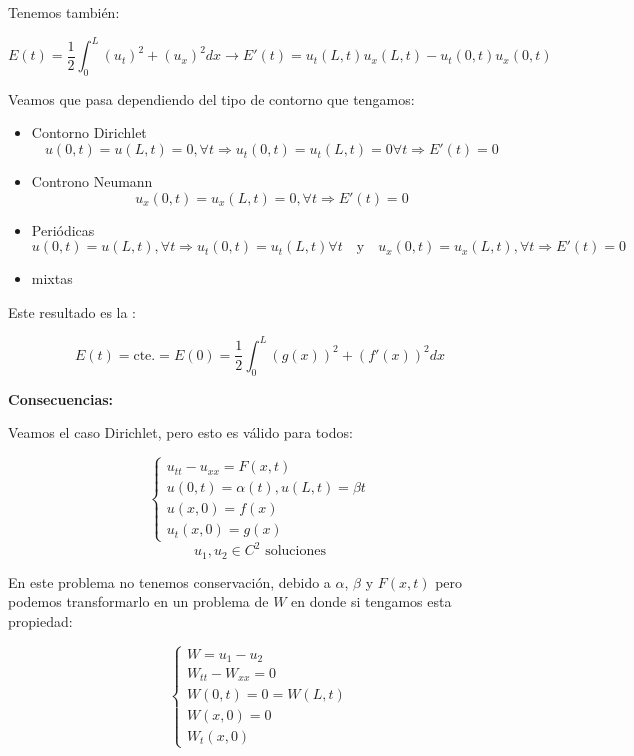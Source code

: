 		 Tenemos también:

		 \[ E(t) =  \frac{1}{2}\int_0^L (u_t)^2 + (u_x)^2 dx \rightarrow E'(t) = u_t (L,t) u_x(L,t) - u_t(0,t) u_x(0,t) \]

		 Veamos que pasa dependiendo del tipo de contorno que tengamos:

		 \begin{itemize}
		 	\item Contorno Dirichlet
		 		\[ u(0,t) = u(L,t) = 0, \forall t \Rightarrow u_t (0,t) = u_t(L,t) = 0 \forall t \Rightarrow E'(t) = 0 \]

		 	\item Controno Neumann
		 		\[ u_x(0,t) = u_x(L,t) = 0, \forall t \Rightarrow  E'(t) = 0 \]

		 	\item Periódicas
		 		\[ u(0,t) = u(L,t), \forall t \Rightarrow u_t (0,t) = u_t(L,t) \forall t \quad \text{y} \quad u_x(0,t) = u_x(L,t), \forall t \Rightarrow E'(t) = 0 \]

		 	\item mixtas

		 \end{itemize}

		 Este resultado es la :

		 \[E(t) = \text{cte.} = E(0) = \frac{1}{2} \int_0^L (g(x))^2 + (f'(x))^2 dx  \]

		 \textbf{Consecuencias:}

		 	Veamos el caso Dirichlet, pero esto es válido para todos:

		 	\[ \begin{cases}
		 		u_{tt} - u_{xx} = F(x,t)\\
		 		u(0,t) = \alpha(t), u(L,t) = \beta{t} \\
		 		u(x,0) = f(x) \\
		 		u_t(x,0) = g(x)
		 	\end{cases}\]
		 	\[u_1,u_2 \in C^2 \text{ soluciones}\]

		 	En este problema no tenemos conservación, debido a $\alpha$, $\beta$ y $F(x,t)$ pero podemos transformarlo en un problema de $W$ en donde si tengamos esta propiedad:

		 	\[\begin{cases}
		 		W = u_1 - u_2 \\
		 		W_{tt} - W_{xx} = 0 \\
		 		W(0,t) = 0 = W(L,t) \\
		 		W(x,0) = 0 \\
		 		W_t(x,0)
		 	\end{cases}\]

